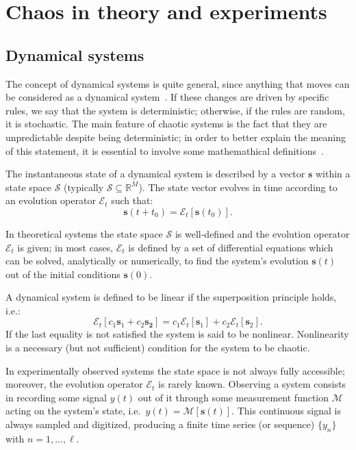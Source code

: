 \chapter{Chaos in theory and experiments}\label{chap: chaos}

\section{Dynamical systems}\label{sec: dynamical systems}

The concept of dynamical systems is quite general, since anything that moves can be considered as a
dynamical system~\cite{ref:fractal_dim}. If these changes are driven
by specific rules, we say that the system is deterministic; otherwise, if the rules
are random, it is stochastic. The main feature of chaotic systems is the fact that they are unpredictable
despite being deterministic; in order to better explain the meaning of this statement, it is essential
to involve some mathemathical definitions~\cite{perinelli2020new}.

The instantaneous state of a dynamical system is described by a vector $\mathbf{s}$ within a
state space $\mathcal{S}$ (typically $\mathcal{S}\subseteq \mathbb{R}^M$).
The state vector evolves in time according to an evolution operator $\mathcal{E}_t$ such that:
\begin{equation}
\label{eq: state space evolution}
    \mathbf{s}(t+t_0)=\mathcal{E}_t[\mathbf{s}(t_0)].
\end{equation}

In theoretical systems the state space $\mathcal{S}$ is well-defined and the evolution operator
$\mathcal{E}_t$ is given; in most cases, $\mathcal{E}_t$ is defined by a set of differential equations
which can be solved, analytically or numerically, to find the system's evolution $\mathbf{s}(t)$
out of the initial conditions $\mathbf{s}(0)$.

A dynamical system is defined to be linear if the superposition principle holds, i.e.:
\begin{equation}
\label{eq: linear systems}
    \mathcal{E}_t[c_1\mathbf{s}_1+c_2\mathbf{s_2}]=c_1\mathcal{E}_t[\mathbf{s}_1]+
    c_2\mathcal{E}_t[\mathbf{s}_2].
\end{equation}
If the last equality is not satisfied the system is said to be nonlinear.
Nonlinearity is a necessary (but not sufficient) condition for the system to be chaotic.

In experimentally observed systems the state space is not always fully accessible; moreover,
the evolution operator $\mathcal{E}_t$ is rarely known.
Observing a system consists in recording some signal $y(t)$ out of it through some measurement
function $\mathcal{M}$ acting on the system's state, i.e.\ $y(t)=\mathcal{M}[\mathbf{s}(t)]$.
This continuous signal is always sampled and digitized, producing a finite time series (or sequence)
$\{y_n\}$ with $n=1,\ldots,\ell$.


